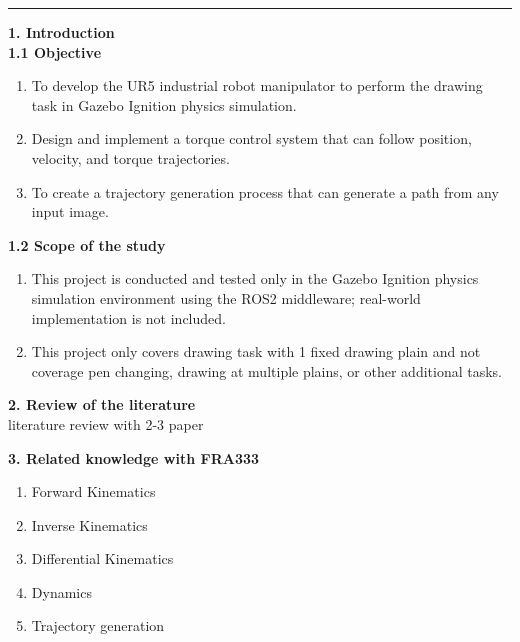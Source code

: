 \documentclass[10pt]{article}
\begin{document}
\vspace{0.4cm}
\noindent
\rule{\textwidth}{1pt}

\linespread{1.5} 
\vspace{0.2cm}
\noindent
\large
\textbf{1. Introduction} \\
\textbf{1.1 Objective}  \\
\normalsize
\begin{enumerate}[nosep, itemsep=-2pt] 
    \item To develop the UR5 industrial robot manipulator to perform the drawing task in Gazebo Ignition physics simulation. 
    \item Design and implement a torque control system that can follow position, velocity, and torque trajectories.
    \item To create a trajectory generation process that can generate a path from any input image.
\end{enumerate}
  
\vspace{8pt}
\noindent
\large 
\textbf{1.2 Scope of the study} \\ 
\normalsize
\begin{enumerate}[nosep, itemsep=-2pt] 
    \item This project is conducted and tested only in the Gazebo Ignition physics simulation environment using the ROS2 middleware; real-world implementation is not included.
    \item This project only covers drawing task with 1 fixed drawing plain and not coverage pen changing, drawing at multiple plains, or other additional tasks.
\end{enumerate}

\large
\noindent
\textbf{2. Review of the literature} \\
\normalsize
\indent
literature review with 2-3 paper

\large
\noindent
\textbf{3. Related knowledge with FRA333} \\
\normalsize
\begin{enumerate}[nosep, itemsep=-2pt]
    \item Forward Kinematics 
    \item Inverse Kinematics
    \item Differential Kinematics
    \item Dynamics
    \item Trajectory generation
\end{enumerate}
\end{document}
